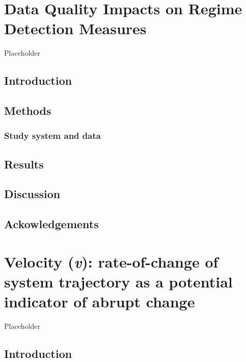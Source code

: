 \documentclass[12pt,twoside,openany]{reedthesis}
\begin{document}
\hypertarget{resampling}{%
\chapter{Data Quality Impacts on Regime Detection Measures}\label{resampling}}

Placeholder

\hypertarget{introduction-3}{%
\section{Introduction}\label{introduction-3}}

\hypertarget{methods-1}{%
\section{Methods}\label{methods-1}}

\hypertarget{study-system-and-data}{%
\subsection{Study system and data}\label{study-system-and-data}}

\hypertarget{results-2}{%
\section{Results}\label{results-2}}

\hypertarget{discussion-2}{%
\section{Discussion}\label{discussion-2}}

\hypertarget{ackowledgements}{%
\section{Ackowledgements}\label{ackowledgements}}

\hypertarget{velocity}{%
\chapter{\texorpdfstring{Velocity (\emph{v}): rate-of-change of system trajectory as a potential indicator of abrupt change}{Velocity (v): rate-of-change of system trajectory as a potential indicator of abrupt change}}\label{velocity}}

Placeholder

\hypertarget{introduction-4}{%
\section{Introduction}\label{introduction-4}}
\end{document}
